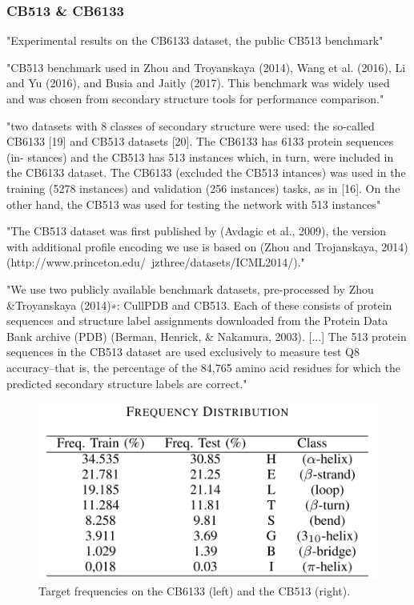 \documentclass[]{scrartcl}
\begin{document}
\subsubsection{CB513 \& CB6133}
"Experimental results on the CB6133 dataset, the public CB513 benchmark" \cite{Li2016}

"CB513 benchmark used in Zhou and Troyanskaya (2014), Wang et al. (2016), Li and Yu (2016), and Busia and Jaitly (2017). This benchmark was widely used and was chosen from secondary structure tools for performance comparison." \cite{Fang2017}

"two datasets with 8 classes of secondary structure were used: the so-called CB6133 [19] and CB513 datasets [20]. The CB6133 has 6133 protein sequences (in- stances) and the CB513 has 513 instances which, in turn, were included in the CB6133 dataset. The CB6133 (excluded the CB513 intances) was used in the training (5278 instances) and validation (256 instances) tasks, as in [16]. On the other hand, the CB513 was used for testing the network with 513 instances" \cite{Hattori2017}

"The CB513 dataset was first published by (Avdagic et al., 2009), the version with additional profile encoding we use is based on (Zhou and  Trojanskaya, 2014) (http://www.princeton.edu/~jzthree/datasets/ICML2014/)." \cite{Jurtz2017}

"We use two publicly available benchmark datasets, pre-processed by Zhou \&Troyanskaya (2014)∗: CullPDB and CB513. Each of these consists of protein sequences and structure label assignments downloaded from the Protein Data Bank archive (PDB) (Berman, Henrick, \& Nakamura, 2003). [...] The 513 protein sequences in the CB513 dataset are used exclusively to measure test Q8 accuracy–that is, the percentage of the 84,765 amino acid residues for which the predicted secondary structure labels are correct." \cite{Busia2017}

\begin{figure}[h]
	\centering
	\includegraphics[width=0.5\linewidth]{targetfreq}
	\caption{Target frequencies on the CB6133 (left) and the CB513 (right).}
	\label{fig:targetfreq}
\end{figure}
\end{document}
